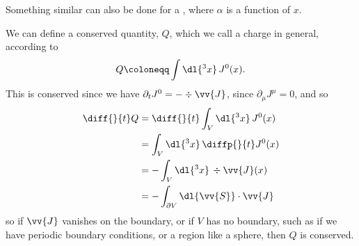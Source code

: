 \documentclass[fleqn]{NotesClass}
\begin{document}
    Something similar can also be done for a , where \(\alpha\) is a function of \(x\).
    
    We can define a conserved quantity, \(Q\), which we call a charge in general, according to
    \begin{equation}
        Q \coloneqq \int \dl{^3x} \, J^0(x).
    \end{equation}
    This is conserved since we have \(\partial_t J^0 = -\div\vv{J}\), since \(\partial_{\mu}J^\mu = 0\), and so
    \begin{align}
        \diff{}{t}Q &= \diff{}{t} \int_V \dl{^3x} \, J^0(x)\\
        &= \int_V \dl{^3x} \, \diffp{}{t}J^0(x)\\
        &= -\int_V \dl{^3x} \, \div\vv{J}(x)\\
        &= - \int_{\partial V} \dl{\vv{S}} \cdot \vv{J}
    \end{align}
    so if \(\vv{J}\) vanishes on the boundary, or if \(V\) has no boundary, such as if we have periodic boundary conditions, or a region like a sphere, then \(Q\) is conserved.
    
\end{document}
